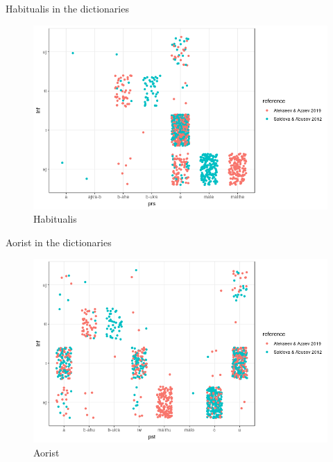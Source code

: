 \begin{frame}{Habitualis in the dictionaries}
\begin{figure}[h]
\centering
\caption{Habitualis}
\includegraphics[scale=0.45]{images/infxprs.png}
\end{figure}
\end{frame}

\begin{frame}{Aorist in the dictionaries}
\begin{figure}[h]
\centering
\caption{Aorist}
\includegraphics[scale=0.45]{images/infxpst.png}
\end{figure}
\end{frame}

